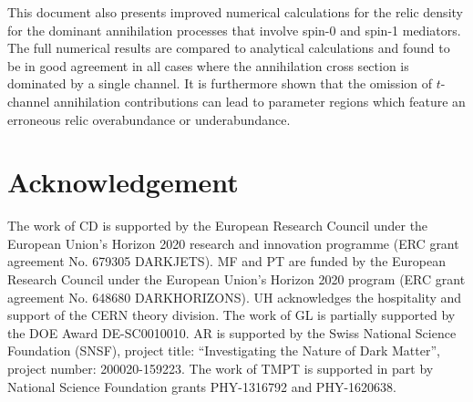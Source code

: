 \documentclass[a4paper, 11pt,notoc]{article}
\begin{document}
This document also presents improved numerical calculations for the relic density for the dominant annihilation processes  that  involve  spin-0  and  spin-1  mediators. The full numerical results are compared to analytical calculations and found to be in good agreement in all cases  where the annihilation cross section is dominated by a single channel. It is furthermore shown that the omission of $t$-channel annihilation contributions can lead to parameter regions which feature an  erroneous  relic overabundance or  underabundance. 

\section{Acknowledgement} 
The work of CD is supported by the European Research Council under the European Union's Horizon 2020 research and innovation programme (ERC grant agreement No. 679305 DARKJETS).  MF and PT are funded by the European Research Council under the European Union's Horizon 2020 program (ERC grant agreement No. 648680 DARKHORIZONS). UH acknowledges the hospitality and support of the CERN theory division. The work of GL is partially supported by the DOE Award DE-SC0010010. AR is supported by the Swiss National Science Foundation (SNSF), project title: ``Investigating the Nature of Dark Matter'', project number: 200020-159223. The work of TMPT is supported in part by National Science Foundation grants PHY-1316792 and PHY-1620638. 



\end{document}
